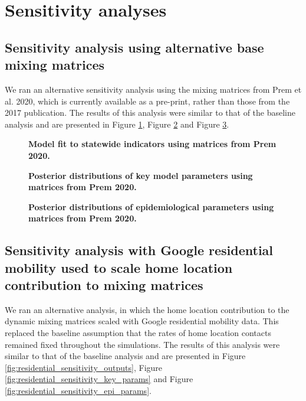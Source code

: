 
\section{Sensitivity analyses}
\subsection{Sensitivity analysis using alternative base mixing matrices}
We ran an alternative sensitivity analysis using the mixing matrices from Prem et al. 2020, which is currently available as a pre-print, rather than those from the 2017 publication. The results of this analysis were similar to that of the baseline analysis and are presented in Figure \ref{fig:prem_sensitivity_outputs}, Figure \ref{fig:prem_sensitivity_key_params} and Figure \ref{fig:prem_sensitivity_epi_params}.

\begin{figure}[ht]
    \caption{\textbf{Model fit to statewide indicators using matrices from Prem 2020.}}
    \label{fig:prem_sensitivity_outputs}
\end{figure}

\begin{figure}[ht]
    \caption{\textbf{Posterior distributions of key model parameters using matrices from Prem 2020.}}
    \label{fig:prem_sensitivity_key_params}
\end{figure}

\begin{figure}[ht]
    \caption{\textbf{Posterior distributions of epidemiological parameters using matrices from Prem 2020.}}
    \label{fig:prem_sensitivity_epi_params}
\end{figure}

\subsection{Sensitivity analysis with Google residential mobility used to scale home location contribution to mixing matrices}
We ran an alternative analysis, in which the home location contribution to the dynamic mixing matrices scaled with Google residential mobility data. This replaced the baseline assumption that the rates of home location contacts remained fixed throughout the simulations. The results of this analysis were similar to that of the baseline analysis and are presented in Figure \ref{fig:residential_sensitivity_outputs}, Figure \ref{fig:residential_sensitivity_key_params} and Figure \ref{fig:residential_sensitivity_epi_params}.

